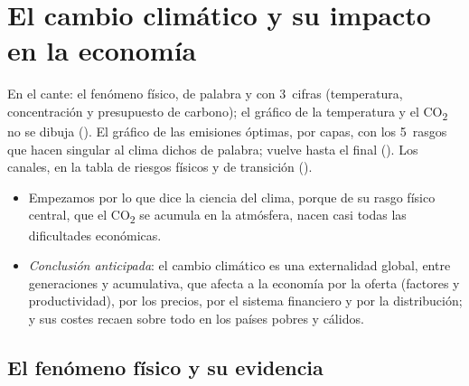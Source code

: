\documentclass[11pt]{article}
\begin{document}
\section{El cambio climático y su impacto en la economía}\label{sec:impacto}

\begin{notaopositor}
En el cante: el fenómeno físico, de palabra y con 3~cifras (temperatura, concentración y presupuesto de carbono); el gráfico de la temperatura y el CO\textsubscript{2} no se dibuja (). El gráfico de las emisiones óptimas, por capas, con los 5~rasgos que hacen singular al clima dichos de palabra; vuelve hasta el final (). Los canales, en la tabla de riesgos físicos y de transición ().
\end{notaopositor}

\begin{itemize}
\item Empezamos por lo que dice la ciencia del clima, porque de su rasgo físico central, que el CO\textsubscript{2} se acumula en la atmósfera, nacen casi todas las dificultades económicas.
\item \emph{Conclusión anticipada}: el cambio climático es una externalidad global, entre generaciones y acumulativa, que afecta a la economía por la oferta (factores y productividad), por los precios, por el sistema financiero y por la distribución; y sus costes recaen sobre todo en los países pobres y cálidos.
\end{itemize}

\subsection{El fenómeno físico y su evidencia}\label{sec:fenomeno}
\end{document}
